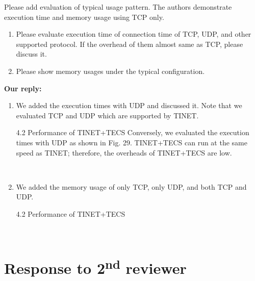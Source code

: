 \documentclass{article}
\newcommand\nd{\textsuperscript{nd}\xspace}
\begin{document}
\begin{enumerate}
\begin{flushleft}
Please add evaluation of typical usage pattern. The authors demonstrate execution time and memory usage using TCP only. 

\begin{enumerate}
\item Please evaluate execution time of connection time of TCP, UDP, and other supported protocol. If the overhead of them almost same as TCP, please discuss it. 

\item Please show memory usages under the typical configuration.
\end{enumerate}
\end{flushleft}

\begin{flushleft}
\textbf{Our reply:}

\begin{enumerate}
\item
    We added the execution times with UDP and discussed it.
    Note that we evaluated TCP and UDP which are supported by TINET.

\begin{itembox}[|]{4.2 Performance of TINET+TECS}
Conversely, we evaluated the execution times with UDP as shown in Fig. 29.
TINET+TECS can run at the same speed as TINET; therefore, the overheads of TINET+TECS are low.
\end{itembox}\\

\item
    We added the memory usage of only TCP, only UDP, and both TCP and UDP.

\begin{itembox}[|]{4.2 Performance of TINET+TECS}
\end{itembox}\\

\end{enumerate}
\end{flushleft}


\end{enumerate}

\clearpage

\section{Response to 2\nd reviewer}
\end{document}
